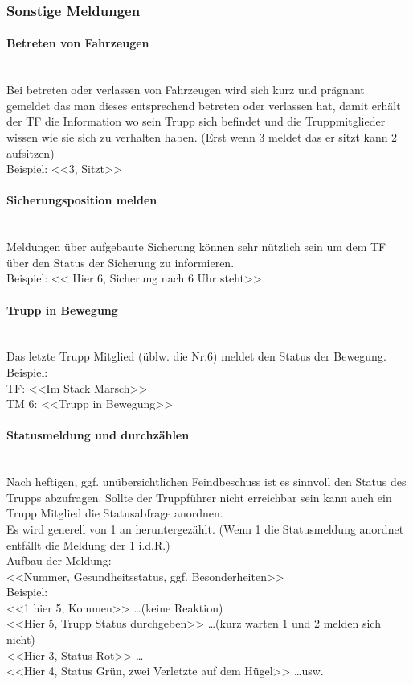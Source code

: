 \subsubsection{Sonstige Meldungen}
	\paragraph*{Betreten von Fahrzeugen}\hfil\\
	Bei betreten oder verlassen von Fahrzeugen wird sich kurz und prägnant gemeldet das man dieses entsprechend betreten oder verlassen hat, damit erhält der TF die Information wo sein Trupp sich befindet und die Truppmitglieder wissen wie sie sich zu verhalten haben. (Erst wenn 3 meldet das er sitzt kann 2 aufsitzen) \\
	Beispiel:  <<3, Sitzt>>

	\paragraph*{Sicherungsposition melden}\hfil\\
	Meldungen über aufgebaute Sicherung können sehr nützlich sein um dem TF über den Status der Sicherung zu informieren. \\
	Beispiel: << Hier 6, Sicherung nach 6 Uhr steht>>

	\paragraph*{Trupp in Bewegung}\hfil\\
	Das letzte Trupp Mitglied (üblw. die Nr.6) meldet den Status der Bewegung. \\
	Beispiel: \\
	TF: <<Im Stack Marsch>> \\
	TM 6: <<Trupp in Bewegung>>
	
	\paragraph*{Statusmeldung und durchzählen}\hfil\\
	Nach heftigen, ggf. unübersichtlichen Feindbeschuss ist es sinnvoll den Status des Trupps abzufragen. Sollte der Truppführer nicht erreichbar sein kann auch ein Trupp Mitglied die Statusabfrage anordnen. \\
	Es wird generell von 1 an heruntergezählt. (Wenn 1 die Statusmeldung  anordnet entfällt die Meldung der 1 i.d.R.)  \\
	Aufbau der Meldung: \\
	<<Nummer, Gesundheitsstatus, ggf. Besonderheiten>>  \\
	Beispiel:\\
	 <<1 hier 5, Kommen>> \dots (keine Reaktion)\\  
	 <<Hier 5, Trupp Status durchgeben>> \dots (kurz warten 1 und 2 melden sich nicht)\\ <<Hier 3, Status Rot>> \dots\\ 
	 <<Hier 4, Status Grün, zwei Verletzte auf dem Hügel>> \dots usw.

